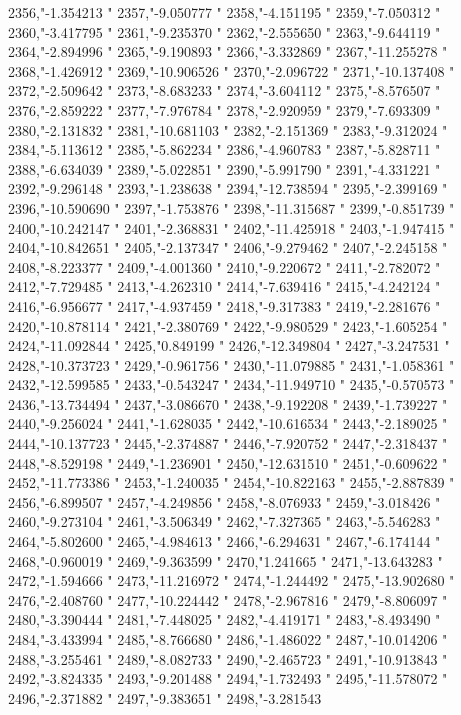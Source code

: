 2356,"-1.354213
"
2357,"-9.050777
"
2358,"-4.151195
"
2359,"-7.050312
"
2360,"-3.417795
"
2361,"-9.235370
"
2362,"-2.555650
"
2363,"-9.644119
"
2364,"-2.894996
"
2365,"-9.190893
"
2366,"-3.332869
"
2367,"-11.255278
"
2368,"-1.426912
"
2369,"-10.906526
"
2370,"-2.096722
"
2371,"-10.137408
"
2372,"-2.509642
"
2373,"-8.683233
"
2374,"-3.604112
"
2375,"-8.576507
"
2376,"-2.859222
"
2377,"-7.976784
"
2378,"-2.920959
"
2379,"-7.693309
"
2380,"-2.131832
"
2381,"-10.681103
"
2382,"-2.151369
"
2383,"-9.312024
"
2384,"-5.113612
"
2385,"-5.862234
"
2386,"-4.960783
"
2387,"-5.828711
"
2388,"-6.634039
"
2389,"-5.022851
"
2390,"-5.991790
"
2391,"-4.331221
"
2392,"-9.296148
"
2393,"-1.238638
"
2394,"-12.738594
"
2395,"-2.399169
"
2396,"-10.590690
"
2397,"-1.753876
"
2398,"-11.315687
"
2399,"-0.851739
"
2400,"-10.242147
"
2401,"-2.368831
"
2402,"-11.425918
"
2403,"-1.947415
"
2404,"-10.842651
"
2405,"-2.137347
"
2406,"-9.279462
"
2407,"-2.245158
"
2408,"-8.223377
"
2409,"-4.001360
"
2410,"-9.220672
"
2411,"-2.782072
"
2412,"-7.729485
"
2413,"-4.262310
"
2414,"-7.639416
"
2415,"-4.242124
"
2416,"-6.956677
"
2417,"-4.937459
"
2418,"-9.317383
"
2419,"-2.281676
"
2420,"-10.878114
"
2421,"-2.380769
"
2422,"-9.980529
"
2423,"-1.605254
"
2424,"-11.092844
"
2425,"0.849199
"
2426,"-12.349804
"
2427,"-3.247531
"
2428,"-10.373723
"
2429,"-0.961756
"
2430,"-11.079885
"
2431,"-1.058361
"
2432,"-12.599585
"
2433,"-0.543247
"
2434,"-11.949710
"
2435,"-0.570573
"
2436,"-13.734494
"
2437,"-3.086670
"
2438,"-9.192208
"
2439,"-1.739227
"
2440,"-9.256024
"
2441,"-1.628035
"
2442,"-10.616534
"
2443,"-2.189025
"
2444,"-10.137723
"
2445,"-2.374887
"
2446,"-7.920752
"
2447,"-2.318437
"
2448,"-8.529198
"
2449,"-1.236901
"
2450,"-12.631510
"
2451,"-0.609622
"
2452,"-11.773386
"
2453,"-1.240035
"
2454,"-10.822163
"
2455,"-2.887839
"
2456,"-6.899507
"
2457,"-4.249856
"
2458,"-8.076933
"
2459,"-3.018426
"
2460,"-9.273104
"
2461,"-3.506349
"
2462,"-7.327365
"
2463,"-5.546283
"
2464,"-5.802600
"
2465,"-4.984613
"
2466,"-6.294631
"
2467,"-6.174144
"
2468,"-0.960019
"
2469,"-9.363599
"
2470,"1.241665
"
2471,"-13.643283
"
2472,"-1.594666
"
2473,"-11.216972
"
2474,"-1.244492
"
2475,"-13.902680
"
2476,"-2.408760
"
2477,"-10.224442
"
2478,"-2.967816
"
2479,"-8.806097
"
2480,"-3.390444
"
2481,"-7.448025
"
2482,"-4.419171
"
2483,"-8.493490
"
2484,"-3.433994
"
2485,"-8.766680
"
2486,"-1.486022
"
2487,"-10.014206
"
2488,"-3.255461
"
2489,"-8.082733
"
2490,"-2.465723
"
2491,"-10.913843
"
2492,"-3.824335
"
2493,"-9.201488
"
2494,"-1.732493
"
2495,"-11.578072
"
2496,"-2.371882
"
2497,"-9.383651
"
2498,"-3.281543
